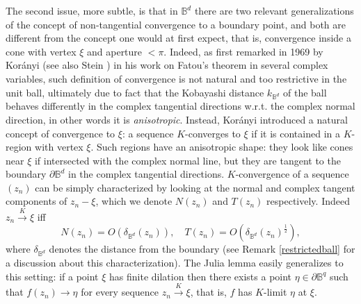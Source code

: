\documentclass[11pt, reqno]{amsart}
\numberwithin{equation}{section}
\theoremstyle{definition}
\newcommand{\B}{\mathbb{B}}
\begin{document}
	The second issue, more subtle, is that in $\B^d$ there are two relevant generalizations of the concept of non-tangential convergence to a boundary point, and both are  different   from the concept one would at first expect, that is, convergence inside  a  cone with vertex  $\xi$ and aperture $<\pi$. 
	Indeed, as first remarked in 1969 by Kor\'anyi  \cite{Kor} (see also  Stein \cite{KorSte,Stein})
	in his work on  Fatou's theorem in several complex variables, such definition of convergence is not natural and too restrictive in the unit ball, ultimately due to fact that the Kobayashi distance $k_{\B^d}$ of the ball behaves differently in the complex tangential directions w.r.t. the complex normal direction,  in other words it is {\sl anisotropic}.
	Instead, Kor\'anyi introduced a natural concept of convergence to $\xi$: a sequence  $K$-converges to $\xi$ if it is contained in a $K$-region with vertex  $\xi$.  
	Such regions have an anisotropic shape: they look like cones near $\xi$ if intersected with the complex normal line, but they are tangent to the boundary $\partial \B^d$ in the complex tangential directions. $K$-convergence of a sequence $(z_n)$  can be simply characterized by looking at the normal and complex tangent components of $z_n-\xi$, which we denote $N(z_n)$ and $T(z_n)$ respectively.
	Indeed $z_n \stackrel{K}\to \xi$ iff 
	\begin{equation}\label{cf1}
		N(z_n)=O(\delta_{\B^d}(z_n)),\quad T(z_n)=O(\delta_{\B^d}(z_n)^{\frac{1}{2}}),
	\end{equation}
	where $\delta_{\B^d}$ denotes the distance from the boundary (see Remark \ref{restrictedball} for a discussion about this characterization).
	The Julia lemma easily generalizes to this setting: if a point $\xi$ has finite dilation then there exists a point $\eta\in \partial \B^q$ such that $f(z_n)\to\eta$ for every sequence $z_n \stackrel{K}\to \xi$, that is, $f$ has $K$-limit $\eta$ at $\xi$. 
	
\end{document}
